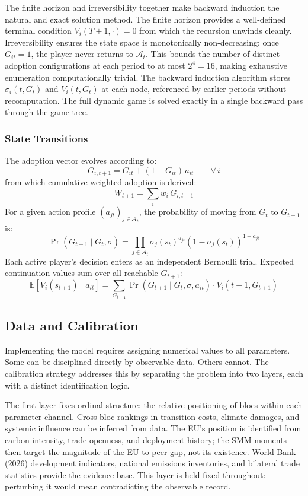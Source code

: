 \documentclass[10pt,a4paper]{article}
\begin{document}
The finite horizon and irreversibility together make backward induction the natural and exact
solution method. The finite horizon provides a well-defined terminal condition $V_i(T+1,\cdot)=0$
from which the recursion unwinds cleanly. Irreversibility ensures the state space is
monotonically non-decreasing: once $G_{it}=1$, the player never returns to $\mathcal{A}_t$.
This bounds the number of distinct adoption configurations at each period to at most $2^4 = 16$,
making exhaustive enumeration computationally trivial. The backward induction algorithm stores
$\sigma_i(t, G_t)$ and $V_i(t, G_t)$ at each node, referenced by earlier periods without
recomputation. The full dynamic game is solved exactly in a single backward pass through the
game tree.

\needspace{12em}
\subsubsection*{State Transitions}

The adoption vector evolves according to:
\[
G_{i,t+1} = G_{it} + (1 - G_{it})\, a_{it} \qquad \forall\, i
\]
from which cumulative weighted adoption is derived:
\[
W_{t+1} = \sum_i w_i\, G_{i,t+1}
\]
For a given action profile $(a_{jt})_{j \in \mathcal{A}_t}$, the probability of moving from
$G_t$ to $G_{t+1}$ is:
\[
\Pr(G_{t+1} \mid G_t, \sigma) =
  \prod_{j \in \mathcal{A}_t} \sigma_j(s_t)^{a_{jt}} \left(1 - \sigma_j(s_t)\right)^{1-a_{jt}}
\]
Each active player's decision enters as an independent Bernoulli trial. Expected continuation
values sum over all reachable $G_{t+1}$:
\[
\mathbb{E}[V_i(s_{t+1}) \mid a_{it}] =
  \sum_{G_{t+1}} \Pr(G_{t+1} \mid G_t, \sigma, a_{it}) \cdot V_i(t+1, G_{t+1})
\]

\clearpage
\needspace{12em}
\subsection{Data and Calibration}

Implementing the model requires assigning numerical values to all parameters. Some can be disciplined
directly by observable data. Others cannot. The calibration strategy addresses this by separating the
problem into two layers, each with a distinct identification logic.

The first layer fixes ordinal structure: the relative positioning of blocs within each parameter channel. Cross-bloc rankings in transition costs, climate damages, and systemic influence can be inferred from data. The EU's position is identified from carbon intensity, trade openness, and deployment history; the SMM moments then target the magnitude of the EU to peer gap, not its existence. World Bank (2026) development indicators, national emissions inventories, and bilateral trade statistics provide the evidence base. This layer is held fixed throughout: perturbing it would mean contradicting the observable record.
\end{document}
